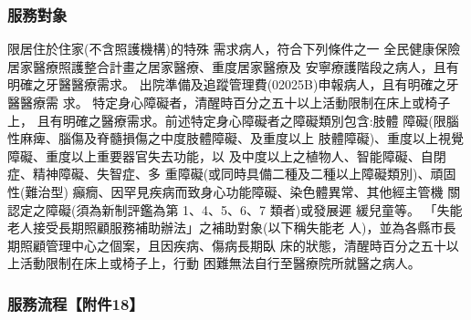 \subsubsection{服務對象}
\begin{outline}
\0 限居住於住家(不含照護機構)的特殊 需求病人，符合下列條件之一
    \1 全民健康保險居家醫療照護整合計畫之居家醫療、重度居家醫療及
    安寧療護階段之病人，且有明確之牙醫醫療需求。
    \1 出院準備及追蹤管理費(02025B)申報病人，且有明確之牙醫醫療需
求。
    \1 特定身心障礙者，清醒時百分之五十以上活動限制在床上或椅子上，
且有明確之醫療需求。前述特定身心障礙者之障礙類別包含:肢體 障礙(限腦性麻痺、腦傷及脊髓損傷之中度肢體障礙、及重度以上 肢體障礙)、重度以上視覺障礙、重度以上重要器官失去功能，以 及中度以上之植物人、智能障礙、自閉症、精神障礙、失智症、多 重障礙(或同時具備二種及二種以上障礙類別)、頑固性(難治型) 癲癇、因罕見疾病而致身心功能障礙、染色體異常、其他經主管機 關認定之障礙(須為新制評鑑為第 1、4、5、6、7 類者)或發展遲 緩兒童等。
    \1 「失能老人接受長期照顧服務補助辦法」之補助對象(以下稱失能老 人)，並為各縣市長期照顧管理中心之個案，且因疾病、傷病長期臥 床的狀態，清醒時百分之五十以上活動限制在床上或椅子上，行動 困難無法自行至醫療院所就醫之病人。

\end{outline}

\subsubsection{服務流程【附件18】}
\setlength{\tabcolsep}{8pt}

